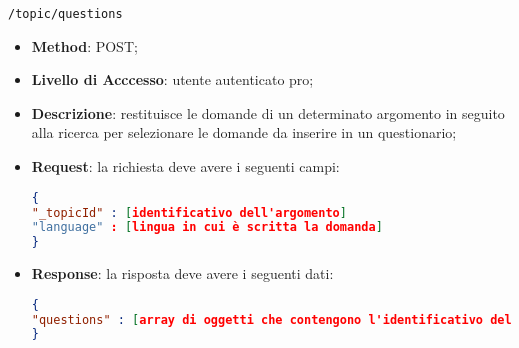 \item \texttt{/topic/questions}
		\begin{itemize}
			\item \textbf{Method}: POST;
			\item \textbf{Livello di Acccesso}: utente autenticato pro;
			\item \textbf{Descrizione}: restituisce le domande di un determinato argomento in seguito alla ricerca per selezionare le domande da inserire in un questionario;
			\item \textbf{Request}: la richiesta deve avere i seguenti campi:
\begin{lstlisting}[language=json,firstnumber=1]
{
"_topicId" : [identificativo dell'argomento]
"language" : [lingua in cui è scritta la domanda]
}
\end{lstlisting}
			\item \textbf{Response}: la risposta deve avere i seguenti dati:
\begin{lstlisting}[language=json,firstnumber=1]
{
"questions" : [array di oggetti che contengono l'identificativo delle domande e l'username dell'autore]
}
\end{lstlisting}
		\end{itemize}